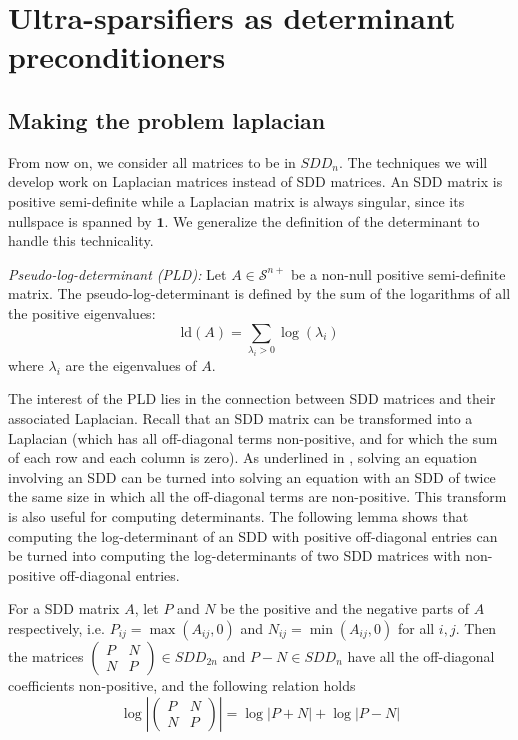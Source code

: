 
\section{Ultra-sparsifiers as determinant preconditioners}


\subsection{Making the problem laplacian}

\label{sec:Making-the-problem}

From now on, we consider all matrices to be in $SDD_{n}$. The techniques
we will develop work on Laplacian matrices instead of SDD matrices.
An SDD matrix is positive semi-definite while a Laplacian matrix is
always singular, since its nullspace is spanned by $\mathbf{1}$.
We generalize the definition of the determinant to handle this technicality.

\begin{definition} \emph{Pseudo-log-determinant (PLD):} Let $A\in\mathcal{S}^{n+}$
be a non-null positive semi-definite matrix. The pseudo-log-determinant
is defined by the sum of the logarithms of all the positive eigenvalues:
\[
\text{ld}\left(A\right)=\sum_{\lambda_{i}>0}\log\left(\lambda_{i}\right)
\]
where $\lambda_{i}$ are the eigenvalues of $A$. \end{definition}

The interest of the PLD lies in the connection between SDD matrices
and their associated Laplacian. Recall that an SDD matrix can be transformed
into a Laplacian (which has all off-diagonal terms non-positive, and
for which the sum of each row and each column is zero). As underlined
in \cite{Gremban1996}, solving an equation involving an SDD can be
turned into solving an equation with an SDD of twice the same size
in which all the off-diagonal terms are non-positive. This transform
is also useful for computing determinants. The following lemma shows
that computing the log-determinant of an SDD with positive off-diagonal
entries can be turned into computing the log-determinants of two SDD
matrices with non-positive off-diagonal entries.

\begin{lemma}\label{non-negative-conversion} For a SDD matrix $A$, let $P$ and $N$ be the positive and the negative parts of $A$ respectively, i.e. $P_{ij} = \max(A_{ij},0)$ and $N_{ij} = \min(A_{ij},0)$ for all $i,j$. Then the matrices $\left(\begin{array}{cc}
P & N\\
N & P
\end{array}\right)\in SDD_{2n}$ and $P-N\in SDD_{n}$ have all the off-diagonal coefficients non-positive,
and the following relation holds
\[
\log\left|\left(\begin{array}{cc}
P & N\\
N & P
\end{array}\right)\right|=\log\left|P+N\right|+\log\left|P-N\right|
\]
\end{lemma}

